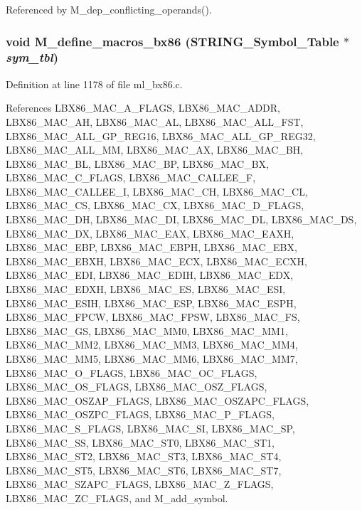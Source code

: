 Referenced by M\_\-dep\_\-conflicting\_\-operands().
\subsubsection{\setlength{\rightskip}{0pt plus 5cm}void M\_\-define\_\-macros\_\-bx86 (\bf{STRING\_\-Symbol\_\-Table} $\ast$ {\em sym\_\-tbl})}\label{ml__bx86_8c_a56b8ff3ce4bd6afc405a3733f34ddfb}




Definition at line 1178 of file ml\_\-bx86.c.

References LBX86\_\-MAC\_\-A\_\-FLAGS, LBX86\_\-MAC\_\-ADDR, LBX86\_\-MAC\_\-AH, LBX86\_\-MAC\_\-AL, LBX86\_\-MAC\_\-ALL\_\-FST, LBX86\_\-MAC\_\-ALL\_\-GP\_\-REG16, LBX86\_\-MAC\_\-ALL\_\-GP\_\-REG32, LBX86\_\-MAC\_\-ALL\_\-MM, LBX86\_\-MAC\_\-AX, LBX86\_\-MAC\_\-BH, LBX86\_\-MAC\_\-BL, LBX86\_\-MAC\_\-BP, LBX86\_\-MAC\_\-BX, LBX86\_\-MAC\_\-C\_\-FLAGS, LBX86\_\-MAC\_\-CALLEE\_\-F, LBX86\_\-MAC\_\-CALLEE\_\-I, LBX86\_\-MAC\_\-CH, LBX86\_\-MAC\_\-CL, LBX86\_\-MAC\_\-CS, LBX86\_\-MAC\_\-CX, LBX86\_\-MAC\_\-D\_\-FLAGS, LBX86\_\-MAC\_\-DH, LBX86\_\-MAC\_\-DI, LBX86\_\-MAC\_\-DL, LBX86\_\-MAC\_\-DS, LBX86\_\-MAC\_\-DX, LBX86\_\-MAC\_\-EAX, LBX86\_\-MAC\_\-EAXH, LBX86\_\-MAC\_\-EBP, LBX86\_\-MAC\_\-EBPH, LBX86\_\-MAC\_\-EBX, LBX86\_\-MAC\_\-EBXH, LBX86\_\-MAC\_\-ECX, LBX86\_\-MAC\_\-ECXH, LBX86\_\-MAC\_\-EDI, LBX86\_\-MAC\_\-EDIH, LBX86\_\-MAC\_\-EDX, LBX86\_\-MAC\_\-EDXH, LBX86\_\-MAC\_\-ES, LBX86\_\-MAC\_\-ESI, LBX86\_\-MAC\_\-ESIH, LBX86\_\-MAC\_\-ESP, LBX86\_\-MAC\_\-ESPH, LBX86\_\-MAC\_\-FPCW, LBX86\_\-MAC\_\-FPSW, LBX86\_\-MAC\_\-FS, LBX86\_\-MAC\_\-GS, LBX86\_\-MAC\_\-MM0, LBX86\_\-MAC\_\-MM1, LBX86\_\-MAC\_\-MM2, LBX86\_\-MAC\_\-MM3, LBX86\_\-MAC\_\-MM4, LBX86\_\-MAC\_\-MM5, LBX86\_\-MAC\_\-MM6, LBX86\_\-MAC\_\-MM7, LBX86\_\-MAC\_\-O\_\-FLAGS, LBX86\_\-MAC\_\-OC\_\-FLAGS, LBX86\_\-MAC\_\-OS\_\-FLAGS, LBX86\_\-MAC\_\-OSZ\_\-FLAGS, LBX86\_\-MAC\_\-OSZAP\_\-FLAGS, LBX86\_\-MAC\_\-OSZAPC\_\-FLAGS, LBX86\_\-MAC\_\-OSZPC\_\-FLAGS, LBX86\_\-MAC\_\-P\_\-FLAGS, LBX86\_\-MAC\_\-S\_\-FLAGS, LBX86\_\-MAC\_\-SI, LBX86\_\-MAC\_\-SP, LBX86\_\-MAC\_\-SS, LBX86\_\-MAC\_\-ST0, LBX86\_\-MAC\_\-ST1, LBX86\_\-MAC\_\-ST2, LBX86\_\-MAC\_\-ST3, LBX86\_\-MAC\_\-ST4, LBX86\_\-MAC\_\-ST5, LBX86\_\-MAC\_\-ST6, LBX86\_\-MAC\_\-ST7, LBX86\_\-MAC\_\-SZAPC\_\-FLAGS, LBX86\_\-MAC\_\-Z\_\-FLAGS, LBX86\_\-MAC\_\-ZC\_\-FLAGS, and M\_\-add\_\-symbol.

